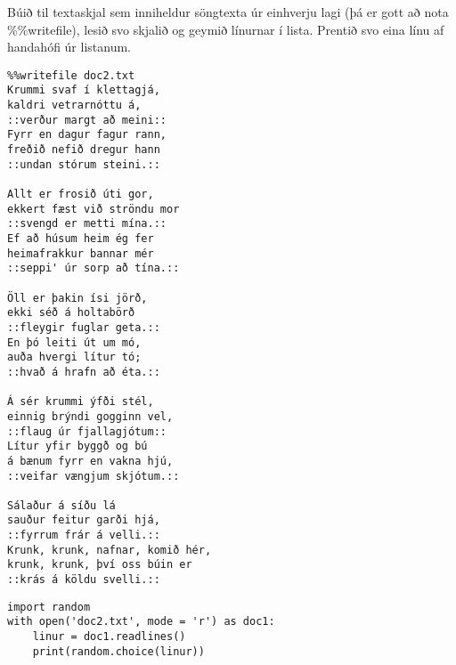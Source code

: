 \begin{exercise}\label{doc2}
Búið til textaskjal sem inniheldur söngtexta úr einhverju lagi (þá er gott að nota \%\%writefile), lesið svo skjalið og geymið línurnar í lista.
Prentið svo eina línu af handahófi úr listanum.
\end{exercise}
\begin{Answer}[ref={doc2}]
	\begin{lstlisting}
%%writefile doc2.txt
Krummi svaf í klettagjá,
kaldri vetrarnóttu á,
::verður margt að meini::
Fyrr en dagur fagur rann,
freðið nefið dregur hann
::undan stórum steini.::

Allt er frosið úti gor,
ekkert fæst við ströndu mor
::svengd er metti mína.::
Ef að húsum heim ég fer
heimafrakkur bannar mér
::seppi' úr sorp að tína.::

Öll er þakin ísi jörð,
ekki séð á holtabörð
::fleygir fuglar geta.::
En þó leiti út um mó,
auða hvergi lítur tó;
::hvað á hrafn að éta.::

Á sér krummi ýfði stél,
einnig brýndi gogginn vel,
::flaug úr fjallagjótum::
Lítur yfir byggð og bú
á bænum fyrr en vakna hjú,
::veifar vængjum skjótum.::

Sálaður á síðu lá
sauður feitur garði hjá,
::fyrrum frár á velli.::
Krunk, krunk, nafnar, komið hér,
krunk, krunk, því oss búin er
::krás á köldu svelli.::		
\end{lstlisting}
	\begin{lstlisting}
import random 
with open('doc2.txt', mode = 'r') as doc1:
	linur = doc1.readlines()
	print(random.choice(linur))
\end{lstlisting}
\end{Answer}